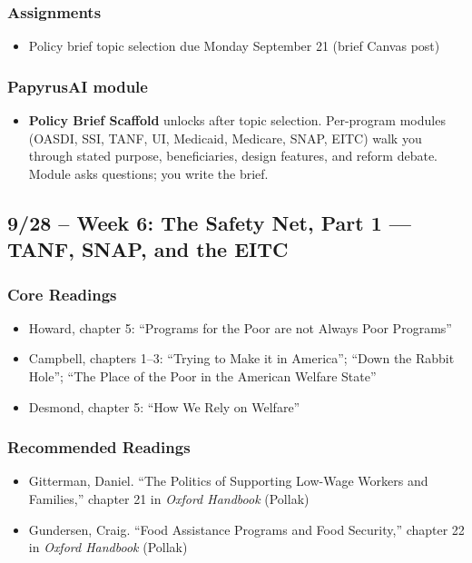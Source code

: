 \documentclass[12pt]{article}
\begin{document}
    \subsubsection*{Assignments}
        \begin{itemize}
            \item Policy brief topic selection due Monday September 21 (brief Canvas post)
        \end{itemize}
    \subsubsection*{PapyrusAI module}
        \begin{itemize}
            \item \textbf{Policy Brief Scaffold} unlocks after topic selection. Per-program modules (OASDI, SSI, TANF, UI, Medicaid, Medicare, SNAP, EITC) walk you through stated purpose, beneficiaries, design features, and reform debate. Module asks questions; you write the brief.
        \end{itemize}

\subsection*{9/28 -- Week 6: The Safety Net, Part 1 --- TANF, SNAP, and the EITC}
    \subsubsection*{Core Readings}
        \begin{itemize}
            \item Howard, chapter 5: ``Programs for the Poor are not Always Poor Programs''
            \item Campbell, chapters 1--3: ``Trying to Make it in America''; ``Down the Rabbit Hole''; ``The Place of the Poor in the American Welfare State''
            \item Desmond, chapter 5: ``How We Rely on Welfare''
        \end{itemize}
    \subsubsection*{Recommended Readings}
        \begin{itemize}
            \item Gitterman, Daniel. ``The Politics of Supporting Low-Wage Workers and Families,'' chapter 21 in \emph{Oxford Handbook} (Pollak)
            \item Gundersen, Craig. ``Food Assistance Programs and Food Security,'' chapter 22 in \emph{Oxford Handbook} (Pollak)
        \end{itemize}
\end{document}
